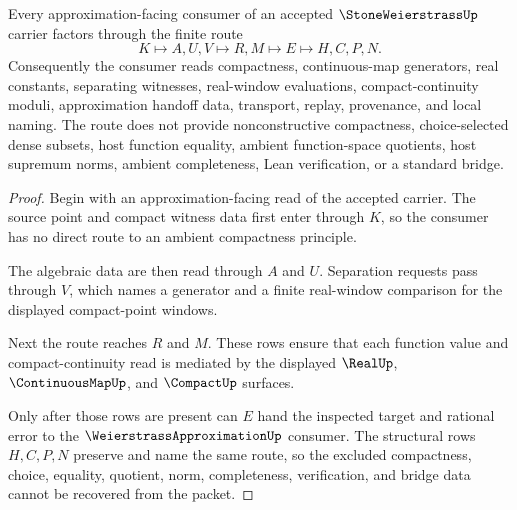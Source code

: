\begin{theorem}
\label{thm:stone-weierstrass-separating-algebra-route}
Every approximation-facing consumer of an accepted $\StoneWeierstrassUp$ carrier factors through the finite route
$$
K \longmapsto A,U,V \longmapsto R,M \longmapsto E \longmapsto H,C,P,N .
$$
Consequently the consumer reads compactness, continuous-map generators, real constants, separating witnesses, real-window evaluations, compact-continuity moduli, approximation handoff data, transport, replay, provenance, and local naming. The route does not provide nonconstructive compactness, choice-selected dense subsets, host function equality, ambient function-space quotients, host supremum norms, ambient completeness, Lean verification, or a standard bridge.
\end{theorem}
\begin{proof}
Begin with an approximation-facing read of the accepted carrier. The source point and compact witness data first enter through $K$, so the consumer has no direct route to an ambient compactness principle.

The algebraic data are then read through $A$ and $U$. Separation requests pass through $V$, which names a generator and a finite real-window comparison for the displayed compact-point windows.

Next the route reaches $R$ and $M$. These rows ensure that each function value and compact-continuity read is mediated by the displayed $\RealUp$, $\ContinuousMapUp$, and $\CompactUp$ surfaces.

Only after those rows are present can $E$ hand the inspected target and rational error to the $\WeierstrassApproximationUp$ consumer. The structural rows $H,C,P,N$ preserve and name the same route, so the excluded compactness, choice, equality, quotient, norm, completeness, verification, and bridge data cannot be recovered from the packet.
\end{proof}

